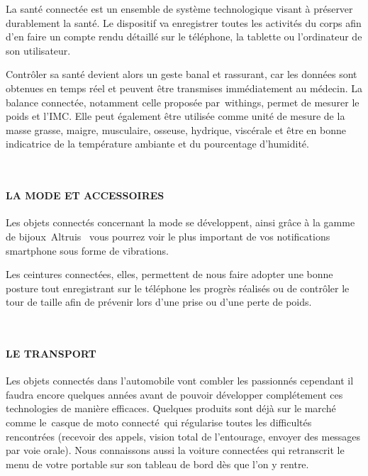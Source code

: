 \documentclass[12pt,a4paper]{report}
\begin{document}
\noindent \begin{flushleft}
	La sant\'{e} connect\'{e}e est un ensemble de syst\`{e}me technologique visant \`{a} pr\'{e}server durablement la sant\'{e}. Le dispositif va enregistrer toutes les activit\'{e}s du corps afin d'en faire un compte rendu d\'{e}taill\'{e} sur le t\'{e}l\'{e}phone, la tablette ou l'ordinateur de son utilisateur.
	
	\noindent Contr\^{o}ler sa sant\'{e} devient alors un geste banal et rassurant, car les donn\'{e}es sont obtenues en temps r\'{e}el et peuvent \^{e}tre transmises imm\'{e}diatement au m\'{e}decin. La balance connect\'{e}e, notamment celle propos\'{e}e par~withings, permet de mesurer le poids et l'IMC. Elle peut \'{e}galement \^{e}tre utilis\'{e}e comme unit\'{e} de mesure de la masse grasse, maigre, musculaire, osseuse, hydrique, visc\'{e}rale et \^{e}tre en bonne indicatrice de la temp\'{e}rature ambiante et du pourcentage d'humidit\'{e}.
	
	\noindent ~
\end{flushleft}

\noindent 
\paragraph{LA MODE ET ACCESSOIRES}

\noindent \begin{flushleft}
	Les objets connect\'{e}s concernant la mode se d\'{e}veloppent, ainsi gr\^{a}ce \`{a} la gamme de bijoux~Altruis~ vous pourrez voir le plus important de vos notifications smartphone sous forme de vibrations.
	
	\noindent Les ceintures connect\'{e}es, elles, permettent de nous faire adopter une bonne posture tout enregistrant sur le t\'{e}l\'{e}phone les progr\`{e}s r\'{e}alis\'{e}s ou de contr\^{o}ler le tour de taille afin de pr\'{e}venir lors d'une prise ou d'une perte de poids.
	
	\noindent ~
\end{flushleft}

\noindent 
\paragraph{LE TRANSPORT}

\noindent \begin{flushleft}
	Les objets connect\'{e}s dans l'automobile vont combler les passionn\'{e}s cependant il faudra encore quelques ann\'{e}es avant de pouvoir d\'{e}velopper compl\'{e}tement ces technologies de mani\`{e}re efficaces. Quelques produits sont d\'{e}j\`{a} sur le march\'{e} comme le~casque de moto connect\'{e}~qui r\'{e}gularise toutes les difficult\'{e}s rencontr\'{e}es (recevoir des appels, vision total de l'entourage, envoyer des messages par voie orale). Nous connaissons aussi la voiture connect\'{e}es qui retranscrit le menu de votre portable sur son tableau de bord d\`{e}s que l'on y rentre.
	
	\noindent ~
\end{flushleft}
\end{document}
